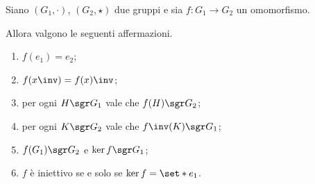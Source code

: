 \begin{proposition}
     \label{prop:prop_omo}
    Siano $(G_1, \cdot)$, $(G_2, \star)$ due gruppi e sia $f : G_1 \to G_2$ un omomorfismo.

    Allora valgono le seguenti affermazioni.
    \begin{enumerate}[label={(\roman*)}, ref={\theproposition: (\roman*)}]
        \item \label{prop:prop_omo:e_va_in_e'}$f(e_1) = e_2$;
        \item \label{prop:prop_omo:inv_passa_dentro}$f(x\inv) = f(x)\inv$;
        \item \label{prop:prop_omo:f(H)_sgr_cod} per ogni $H \sgr G_1$ vale che $f(H) \sgr G_2$;
        \item \label{prop:prop_omo:f\inv(K)_sgr_dom}  per ogni $K \sgr G_2$ vale che $f\inv(K) \sgr G_1$;
        \item \label{prop:prop_omo:imm_ker_sgr}$f(G_1) \sgr G_2$ e $\ker f \sgr G_1$;
        \item \label{prop:prop_omo:cond_iniett}$f$ è iniettivo se e solo se $\ker f = \set*{e_1}$.
    \end{enumerate}
\end{proposition}
